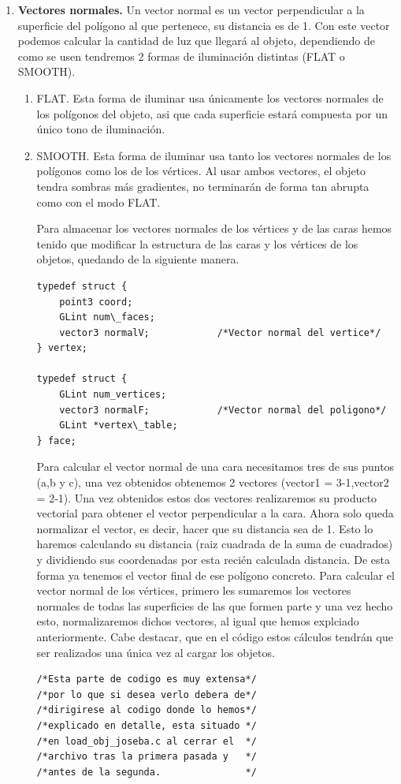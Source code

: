 \documentclass[12pt,a4paper]{article}
\begin{document}
\begin{enumerate}
\begin{enumerate}
\begin{enumerate}
\item \textbf{Vectores normales.}
Un vector normal es un vector perpendicular a la superficie del polígono al que pertenece, su distancia es de 1. Con este vector podemos calcular la cantidad de luz que llegará al objeto, dependiendo de como se usen tendremos 2 formas de iluminación distintas (FLAT o SMOOTH). \newline
\begin{enumerate}
\item {FLAT.}
Esta forma de iluminar usa únicamente los vectores normales de los polígonos del objeto, asi que cada superficie estará compuesta por un único tono de iluminación.
\item {SMOOTH.}
Esta forma de iluminar usa tanto los vectores normales de los polígonos como los de los vértices. Al usar ambos vectores, el objeto tendra sombras más gradientes, no terminarán de forma tan abrupta como con el modo FLAT.\newline

Para almacenar los vectores normales de los vértices y de las caras hemos tenido que modificar la estructura de las caras y los vértices de los objetos, quedando de la siguiente manera.
\begin{lstlisting}
typedef struct {
    point3 coord;    
    GLint num\_faces;  
    vector3 normalV;			/*Vector normal del vertice*/
} vertex;

typedef struct {
    GLint num_vertices;   
    vector3 normalF;			/*Vector normal del poligono*/
    GLint *vertex\_table; 
} face;
\end{lstlisting}

Para calcular el vector normal de una cara necesitamos tres de sus puntos (a,b y c), una vez obtenidos obtenemos 2 vectores (vector1 = 3-1,vector2 = 2-1). Una vez obtenidos estos dos vectores realizaremos su producto vectorial para obtener el vector perpendicular a la cara.\newline
Ahora solo queda normalizar el vector, es decir, hacer que su distancia sea de 1. Esto lo haremos calculando su distancia (raiz cuadrada de la suma de cuadrados) y dividiendo sus coordenadas por esta recién calculada distancia. De esta forma ya tenemos el vector final de ese polígono concreto.\newline
Para calcular el vector normal de los vértices, primero les sumaremos los vectores normales de todas las superficies de las que formen parte y una vez hecho esto, normalizaremos dichos vectores, al igual que hemos explciado anteriormente.\newline
Cabe destacar, que en el código estos cálculos tendrán que ser realizados una única vez al cargar los objetos. 
\begin{lstlisting}
/*Esta parte de codigo es muy extensa*/
/*por lo que si desea verlo debera de*/
/*dirigirese al codigo donde lo hemos*/
/*explicado en detalle, esta situado */
/*en load_obj_joseba.c al cerrar el  */
/*archivo tras la primera pasada y   */
/*antes de la segunda.               */
\end{lstlisting}


\end{enumerate}
\end{enumerate}
\end{enumerate}
\end{enumerate}
\end{document}
